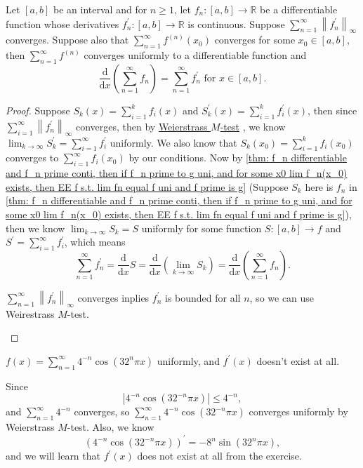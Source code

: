 \begin{corollary}
    Let \([a, b]\) be an interval and for \(n \ge 1\), let \(f_n: [a, b] \to \mathbb{R} \) be a differentiable function whose derivatives \(f_n^{\prime} :[a, b] \to \mathbb{R} \) is continuous. Suppose \(\sum_{n=1}^{\infty} \left\lVert f_n^{\prime}  \right\rVert _\infty \) converges. Suppose also that \(\sum_{n=1}^{\infty} f^{(n)}(x_0) \) converges for some \(x_0 \in [a, b]\), then \(\sum_{n=1}^{\infty} f^{(n)} \) converges uniformly to a differentiable function and 
    \[
        \frac{\mathrm{d}}{\mathrm{d}x} \left( \sum_{n=1}^{\infty} f_n  \right) = \sum_{n=1}^{\infty} f_n^{\prime} \text{ for } x \in [a, b].    
    \]        
\end{corollary}
\begin{proof}
    Suppose \(S_k(x) = \sum_{i=1}^k f_i(x) \) and \(S_k^{\prime} (x) = \sum_{i=1}^k f_i^{\prime} (x) \), then since \(\sum_{i=1}^{\infty} \left\lVert f_n^{\prime}  \right\rVert _{\infty }  \) converges, then by \hyperref[thm: Weierstrass M-test (bounded and conti)]{Weierstrass \(M\)-test} , we know \(\lim_{k \to \infty} S_k^{\prime} = \sum_{i=1}^{\infty} f_i^{\prime}   \) uniformly. We also know that \(S_k(x_0) = \sum_{i=1}^k f_i(x_0) \) converges to \(\sum_{i=1}^{\infty} f_i(x_0) \) by our conditions. Now by \autoref{thm: f_n differentiable and f_n prime conti, then if f_n prime to g uni, and for some x0 lim f_n(x_0) exists, then EE f s.t. lim fn equal f uni and f prime is g} (Suppose \(S_k\) here is \(f_n\) in \autoref{thm: f_n differentiable and f_n prime conti, then if f_n prime to g uni, and for some x0 lim f_n(x_0) exists, then EE f s.t. lim fn equal f uni and f prime is g}), then we know \(\lim_{k \to \infty} S_k = S\) uniformly for some function \(S:[a, b] \to f\) and \(S^{\prime} = \sum_{i=1}^{\infty} f_i^{\prime}  \), which means 
    \[
        \sum_{n=1}^{\infty} f_n^{\prime} = \frac{\mathrm{d}}{\mathrm{d}x} S  = \frac{\mathrm{d}}{\mathrm{d}x} \left( \lim_{k \to \infty} S_k  \right) = \frac{\mathrm{d}}{\mathrm{d}x} \left( \sum_{n=1}^{\infty} f_n  \right).   
    \] 
    \begin{note}
        \(\sum_{n=1}^{\infty} \left\lVert f_n^{\prime}  \right\rVert_\infty   \) converges inplies \(f_n^{\prime} \) is bounded for all \(n\), so we can use Weirestrass \(M\)-test.    
    \end{note}         
\end{proof}

\begin{eg}
    \(f(x) = \sum_{n=1}^{\infty} 4^{-n} \cos \left( 32^n \pi x \right)  \)  uniformly, and \(f^{\prime} (x)\) doesn't exist at all. 
\end{eg}
\begin{explanation}
    Since 
    \[
        \left\vert 4^{-n} \cos \left( 32^{-n} \pi x \right)  \right\vert \le 4^{-n},
    \] and \(\sum_{n=1}^{\infty} 4^{-n} \) converges, so \(\sum_{n=1}^{\infty} 4^{-n} \cos \left( 32^{-n} \pi x \right)  \) converges uniformly by Weierstrass \(M\)-test. Also, we know 
    \[
        \left( 4^{-n} \cos \left( 32^{-n} \pi x \right)  \right)^{\prime} = -8^n \sin \left( 32^n \pi x \right),  
    \]  and we will learn that \(f^{\prime} (x)\) does not exist at all from the exercise. 
\end{explanation}